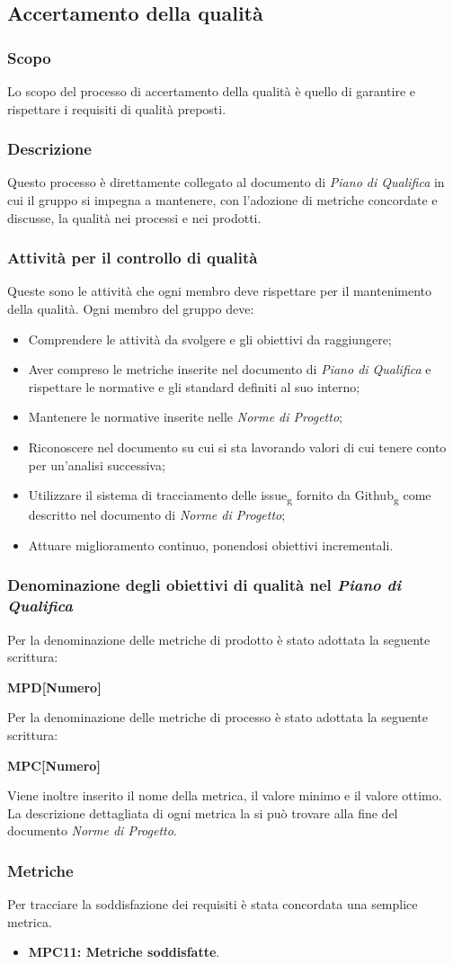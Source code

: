 \subsection{Accertamento della qualità}

\subsubsection{Scopo}
Lo scopo del processo di accertamento della qualità è quello di garantire e rispettare i requisiti di qualità preposti.
\subsubsection{Descrizione}
Questo processo è direttamente collegato al documento di \textit{Piano di Qualifica} in cui il gruppo si impegna a mantenere, con l'adozione di metriche concordate e discusse, la qualità nei processi e nei prodotti.
\subsubsection{Attività per il controllo di qualità}
Queste sono le attività che ogni membro deve rispettare per il mantenimento della qualità.
Ogni membro del gruppo deve:
\begin{itemize}
\item Comprendere le attività da svolgere e gli obiettivi da raggiungere;
\item Aver compreso le metriche inserite nel documento di \textit{Piano di Qualifica} e rispettare le normative e gli standard definiti al suo interno;
\item Mantenere le normative inserite nelle \textit{Norme di Progetto};
\item Riconoscere nel documento su cui si sta lavorando valori di cui tenere conto per un'analisi successiva;
\item Utilizzare il sistema di tracciamento delle issue\textsubscript{g} fornito da Github\textsubscript{g} come descritto nel documento di \textit{Norme di Progetto};
\item Attuare miglioramento continuo, ponendosi obiettivi incrementali.
\end{itemize}
\subsubsection{Denominazione degli obiettivi di qualità nel \textit{Piano di Qualifica}}
Per la denominazione delle metriche di prodotto è stato adottata la seguente scrittura:
\begin{center}\textbf{MPD[Numero]}\end{center}
Per la denominazione delle metriche di processo è stato adottata la seguente scrittura:
\begin{center}\textbf{MPC[Numero]}\end{center}
Viene inoltre inserito il nome della metrica, il valore minimo e il valore ottimo.\\
La descrizione dettagliata di ogni metrica la si può trovare alla fine del documento \textit{Norme di Progetto}.
\subsubsection{Metriche} 
Per tracciare la soddisfazione dei requisiti è stata concordata una semplice metrica.
\begin{itemize}
    \item \textbf{MPC11: Metriche soddisfatte}.
\end{itemize}
